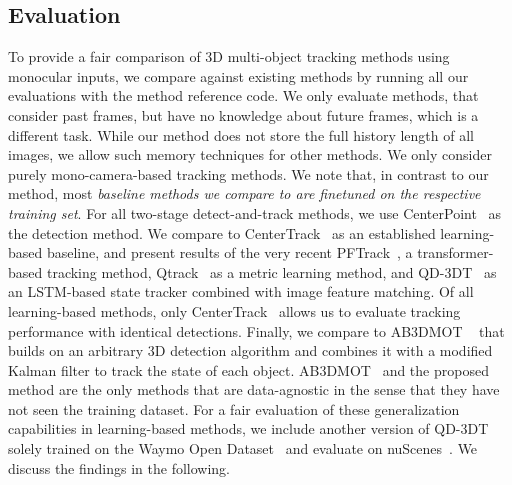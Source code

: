 \subsection{Evaluation}\label{ssec:eval}
To provide a fair comparison of 3D multi-object tracking methods using monocular inputs, we compare against existing methods by running all our evaluations with the method reference code. We only evaluate methods, that consider past frames, but have no knowledge about future frames, which is a different task. While our method does not store the full history length of all images, we allow such memory techniques for other methods. We only consider purely mono-camera-based tracking methods.%
We note that, in contrast to our method, most \emph{baseline methods we compare to are finetuned on the respective training set}. For all two-stage detect-and-track methods, we use CenterPoint~\cite{yin2021center} as the detection method. We compare to CenterTrack~\cite{zhou2020CenterTrack} as an established learning-based baseline, and present results of the very recent PFTrack~\cite{pang2023PFtrack}, a transformer-based tracking method, Qtrack~\cite{yang2022qtrack} as a metric learning method, and QD-3DT~\cite{hu2021QD3DT} as an LSTM-based state tracker combined with image feature matching. 
Of all learning-based methods, only CenterTrack~\cite{zhou2020CenterTrack} allows us to evaluate tracking performance with identical detections. Finally, we compare to AB3DMOT ~\cite{weng2020AB3DMOT} that builds on an arbitrary 3D detection algorithm and combines it with a modified Kalman filter to track the state of each object. AB3DMOT~\cite{weng2020AB3DMOT} and the proposed method are the only methods that are data-agnostic in the sense that they have not seen the training dataset. For a fair evaluation of these generalization capabilities in learning-based methods, we include another version of QD-3DT solely trained on the Waymo Open Dataset~\cite{sun2020scalability} and evaluate on nuScenes~\cite{caesar2020nuscenes}.  We discuss the findings in the following.





